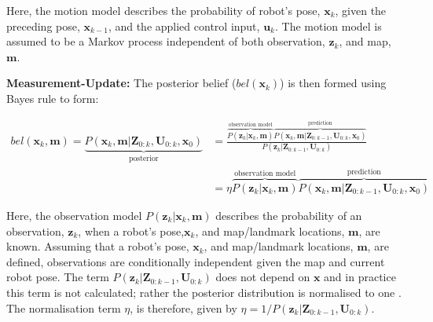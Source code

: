 Here, the motion model describes the probability of robot's pose, $\mathbf{x}_k$, given the preceding pose, $\mathbf{x}_{k-1}$, and the applied control input, $\mathbf{u}_k$. The motion model is assumed to be a Markov process independent of both observation, $\mathbf{z}_k$, and map, $\mathbf{m}$.

\textbf{Measurement-Update:} The posterior belief ($bel(\mathbf{x}_k)$) is then formed using Bayes rule to form:

\begin{equation}
\begin{split}
bel(\mathbf{x}_k, \mathbf{m}) = \underbrace{P(\mathbf{x}_k,\mathbf{m}|\mathbf{Z}_{0:k}, \mathbf{U}_{0:k}, \mathbf{x}_0)}_{\text{posterior}} &= \frac{\overbrace{P(\mathbf{z}_k|\mathbf{x}_{k},\mathbf{m})}^{\text{observation model}} \overbrace{P(\mathbf{x}_k,\mathbf{m}|\mathbf{Z}_{0:k-1}, \mathbf{U}_{0:k}, \mathbf{x}_0)}^{\text{prediction}}}{P(\mathbf{z}_k|\mathbf{Z}_{0:k-1},\mathbf{U}_{0:k})} \\
&= \eta \overbrace{P(\mathbf{z}_k|\mathbf{x}_{k},\mathbf{m})}^{\text{observation model}} \overbrace{P(\mathbf{x}_k,\mathbf{m}|\mathbf{Z}_{0:k-1}, \mathbf{U}_{0:k}, \mathbf{x}_0)}^{\text{prediction}}
\end{split}
\label{eq:measureup}
\end{equation}

Here, the observation model $P(\mathbf{z}_k|\mathbf{x}_{k},\mathbf{m})$ describes the probability of an observation, $\mathbf{z}_k$, when a robot's pose,$\mathbf{x}_k$, and map/landmark locations, $\mathbf{m}$, are known. Assuming that a robot's pose, $\mathbf{x}_k$, and map/landmark locations, $\mathbf{m}$, are defined, observations are conditionally independent given the map and current robot pose. The term $P(\mathbf{z}_k|\mathbf{Z}_{0:k-1},\mathbf{U}_{0:k})$ does not depend on $\mathbf{x}$ and in practice this term is not calculated; rather the posterior distribution is normalised to one \cite{Thrun2006}. The normalisation term $\eta$, is therefore, given by $\eta = 1/P(\mathbf{z}_k|\mathbf{Z}_{0:k-1},\mathbf{U}_{0:k})$.

